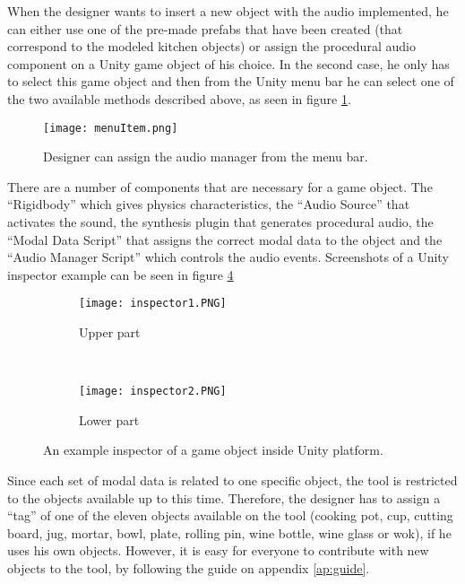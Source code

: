 When the designer wants to insert a new object with the audio implemented, he can either use one of the pre-made prefabs that have been created (that correspond to the modeled kitchen objects) or assign the procedural audio component on a Unity\textsuperscript{\textregistered} game object of his choice. In the second case, he only has to select this game object and then from the Unity\textsuperscript{\textregistered} menu bar he can select one of the two available methods described above, as seen in figure \ref{fig:menu_item}.

\begin{figure}[H]
  \centering
    \texttt{[image: menuItem.png]}
      \caption{Designer can assign the audio manager from the menu bar.}
      \label{fig:menu_item}
\end{figure}

There are a number of components that are necessary for a game object. The ``Rigidbody'' which gives physics characteristics, the ``Audio Source'' that activates the sound, the synthesis plugin that generates  procedural audio, the ``Modal Data Script'' that assigns the correct modal data to the object and the ``Audio Manager Script'' which controls the audio events. Screenshots of a Unity\textsuperscript{\textregistered} inspector example can be seen in figure \ref{fig:audio_insp}

\begin{figure}[H]
    \centering
    \begin{subfigure}[b]{0.45\textwidth}
        \texttt{[image: inspector1.PNG]}
        \caption{Upper part}
        \label{fig:FB}
    \end{subfigure}
    ~ %
    \begin{subfigure}[b]{0.45\textwidth}
        \texttt{[image: inspector2.PNG]}
        \caption{Lower part}
        \label{fig:sin}
    \end{subfigure}
    \caption{An example inspector of a game object inside Unity\textsuperscript{\textregistered} platform.}\label{fig:audio_insp}
\end{figure}

Since each set of modal data is related to one specific object, the tool is restricted to the objects available up to this time. Therefore, the designer has to assign a ``tag'' of one of the eleven objects available on the tool (cooking pot, cup, cutting board, jug, mortar, bowl, plate, rolling pin, wine bottle, wine glass or wok), if he uses his own objects. However, it is easy for everyone to contribute with new objects to the tool, by following the guide on appendix \ref{ap:guide}.

